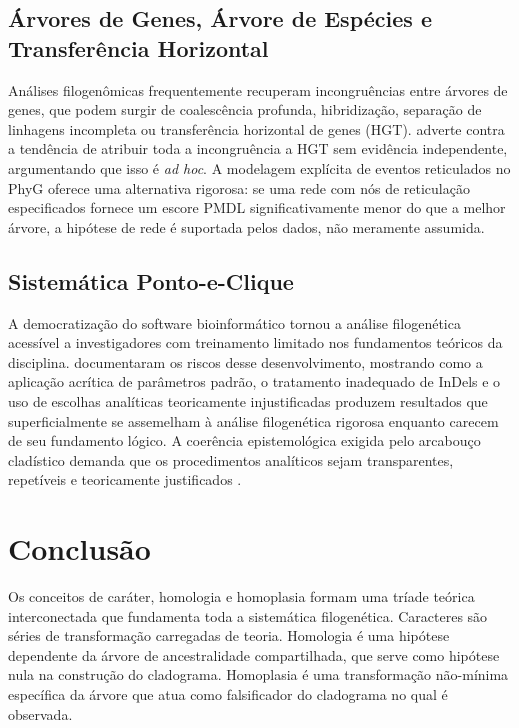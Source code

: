 \subsection{Árvores de Genes, Árvore de Espécies e Transferência Horizontal}

Análises filogenômicas frequentemente recuperam incongruências entre árvores de genes, que podem surgir de coalescência profunda, hibridização, separação de linhagens incompleta ou transferência horizontal de genes (HGT). \textcite{wheeler2012} adverte contra a tendência de atribuir toda a incongruência a HGT sem evidência independente, argumentando que isso é \textit{ad hoc}. A modelagem explícita de eventos reticulados no PhyG \parencite{wheeleretal2024} oferece uma alternativa rigorosa: se uma rede com nós de reticulação especificados fornece um escore PMDL significativamente menor do que a melhor árvore, a hipótese de rede é suportada pelos dados, não meramente assumida.

\subsection{Sistemática Ponto-e-Clique}

A democratização do software bioinformático tornou a análise filogenética acessível a investigadores com treinamento limitado nos fundamentos teóricos da disciplina. \textcite{grant2003} documentaram os riscos desse desenvolvimento, mostrando como a aplicação acrítica de parâmetros padrão, o tratamento inadequado de InDels e o uso de escolhas analíticas teoricamente injustificadas produzem resultados que superficialmente se assemelham à análise filogenética rigorosa enquanto carecem de seu fundamento lógico. A coerência epistemológica exigida pelo arcabouço cladístico demanda que os procedimentos analíticos sejam transparentes, repetíveis e teoricamente justificados \parencite{wheeleretal2006}.

\section{Conclusão}

Os conceitos de caráter, homologia e homoplasia formam uma tríade teórica interconectada que fundamenta toda a sistemática filogenética. Caracteres são séries de transformação carregadas de teoria. Homologia é uma hipótese dependente da árvore de ancestralidade compartilhada, que serve como hipótese nula na construção do cladograma. Homoplasia é uma transformação não-mínima específica da árvore que atua como falsificador do cladograma no qual é observada.

